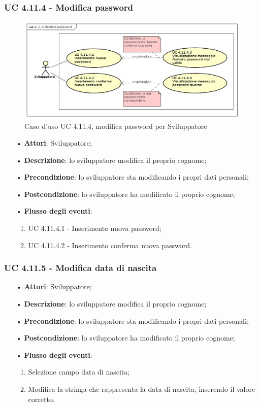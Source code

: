 \subsubsection{UC 4.11.4 - Modifica password}
\begin{figure}[H]
	\centering
	\includegraphics[width=15cm, keepaspectratio]{img/UC4114.png} 
	\caption{Caso d'uso UC 4.11.4, modifica password per Sviluppatore}\label{fig:4114}
\end{figure}
\begin{itemize}
	\item[•]\textbf{Attori}: Sviluppatore;
	\item[•]\textbf{Descrizione}: lo sviluppatore modifica il proprio cognome;
	\item[•]\textbf{Precondizione}: lo sviluppatore sta modificando i propri dati personali;
	\item[•]\textbf{Postcondizione}: lo sviluppatore ha modificato il proprio cognome; 
	\item[•]\textbf{Flusso degli eventi}: 
	\begin{enumerate}
		\item UC 4.11.4.1 - Inserimento nuova password;
		\item UC 4.11.4.2 - Inserimento conferma nuova password.
	\end{enumerate}
\end{itemize}
\subsubsection{UC 4.11.5 - Modifica data di nascita}
\begin{itemize}
	\item[•]\textbf{Attori}: Sviluppatore;
	\item[•]\textbf{Descrizione}: lo sviluppatore modifica il proprio cognome;
	\item[•]\textbf{Precondizione}: lo sviluppatore sta modificando i propri dati personali;
	\item[•]\textbf{Postcondizione}: lo sviluppatore ha modificato il proprio cognome; 
	\item[•]\textbf{Flusso degli eventi}: 
	\begin{enumerate}
		\item Selezione campo data di nascita;
		\item Modifica la stringa che rappresenta la data di nascita, inserendo il valore corretto.
	\end{enumerate}
\end{itemize}
